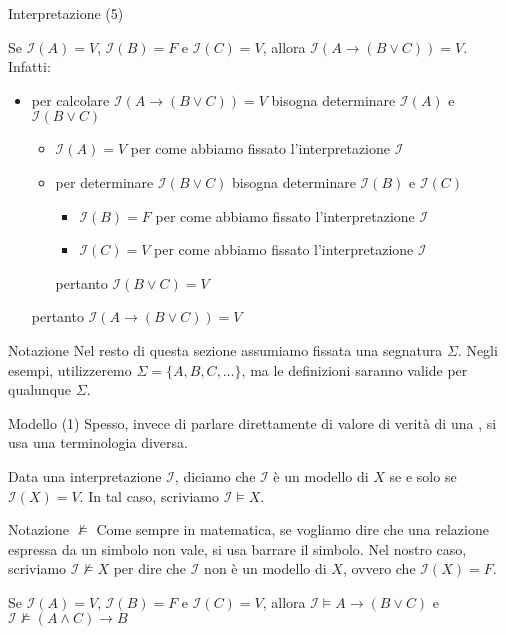 \documentclass[aspectratio=169,10pt,dvipsnames,xcolor=table,handout]{beamer}
\newcommand{\mcI}{\mathcal{I}}
\begin{document}
\begin{frame}{Interpretazione (5)}

    \begin{example}
        Se $\mcI(A)=V$, $\mcI(B)=F$ e $\mcI(C)=V$, allora $\mcI(A \to (B \vee C))= V$. Infatti:
        \begin{itemize}
            \item per calcolare  $\mcI(A \to (B \vee C))= V$ bisogna determinare $\mcI(A)$ e $\mcI(B \vee C)$
                  \begin{itemize}
                      \item $\mcI(A) = V$ per come abbiamo fissato l'interpretazione $\mcI$
                      \item \smallskip per determinare $\mcI(B \vee C)$ bisogna determinare $\mcI(B)$ e $\mcI(C)$
                            \begin{itemize}
                                \item $\mcI(B)=F$ per come abbiamo fissato l'interpretazione $\mcI$
                                \item $\mcI(C)=V$ per come abbiamo fissato l'interpretazione $\mcI$
                            \end{itemize}
                            pertanto $\mcI(B \vee C)=V$
                  \end{itemize}
                  pertanto $\mcI(A \to (B \vee C))=V$
        \end{itemize}
    \end{example}

    \begin{block}{Notazione}
        Nel resto di questa sezione assumiamo fissata una segnatura $\Sigma$. Negli esempi, utilizzeremo $\Sigma=\{A, B, C, \ldots\}$, ma le definizioni saranno valide per qualunque $\Sigma$.
    \end{block}
\end{frame}

\begin{frame}{Modello (1)}
    Spesso, invece di parlare direttamente di valore di verità di una \fp, si usa una terminologia diversa.

    \begin{definition}[Modello]
        Data una interpretazione $\mcI$, diciamo che $\mcI$ è un \alert{modello} di $X$ se e solo se $\mcI(X)=V$. In tal caso, scriviamo $\mcI \models X$.
    \end{definition}
    \pause

    \begin{block}{Notazione $\not\models$}
        Come sempre in matematica, se vogliamo dire che una relazione espressa da un simbolo non vale, si usa barrare il simbolo. Nel nostro caso, scriviamo $\mcI \not\models X$ per dire che $\mcI$ non è un modello di $X$, ovvero che $\mcI(X)=F$.
    \end{block}
    \pause

    \begin{example}
        Se $\mcI(A)=V$, $\mcI(B)=F$ e $\mcI(C)=V$, allora $\mcI \models A \to (B \vee C)$ e $\mcI \not\models (A \land C) \to B$
    \end{example}
\end{frame}
\end{document}
